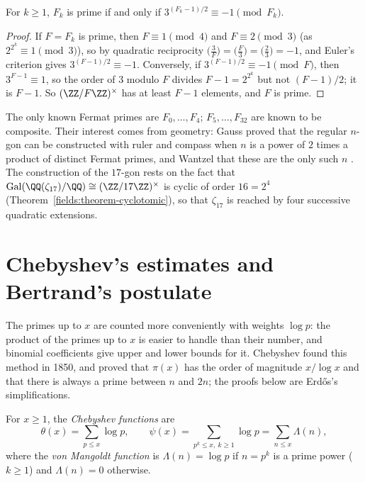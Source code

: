 \begin{theorem}\label{prime-numbers:theorem-pepin}
For $k \geq 1$, $F_k$ is prime if and only if $3^{(F_k - 1)/2} \equiv -1 \pmod{F_k}$.
\end{theorem}

\begin{proof}
If $F = F_k$ is prime, then $F \equiv 1 \pmod 4$ and $F \equiv 2 \pmod 3$ (as $2^{2^k} \equiv 1 \pmod 3$), so by quadratic reciprocity $\bigl(\frac{3}{F}\bigr) = \bigl(\frac{F}{3}\bigr) = \bigl(\frac{2}{3}\bigr) = -1$,
and Euler's criterion gives $3^{(F-1)/2} \equiv -1$. Conversely, if $3^{(F-1)/2} \equiv -1 \pmod F$, then $3^{F-1} \equiv 1$, so the order of $3$ modulo $F$ divides $F - 1 = 2^{2^k}$ but not
$(F - 1)/2$; it is $F - 1$. So $(\ZZ/F\ZZ)^\times$ has at least $F - 1$ elements, and $F$ is prime.
\end{proof}

\begin{remark}\label{prime-numbers:remark-gauss-polygons}
The only known Fermat primes are $F_0, \ldots, F_4$; $F_5, \ldots, F_{32}$ are known to be composite. Their interest comes from geometry: Gauss proved that the regular $n$-gon can be constructed
with ruler and compass when $n$ is a power of $2$ times a product of distinct Fermat primes, and Wantzel that these are the only such $n$ \cite{hardy-wright}. The construction of the
$17$-gon rests on the fact that $\operatorname{Gal}(\QQ(\zeta_{17})/\QQ) \cong (\ZZ/17\ZZ)^\times$ is cyclic of order $16 = 2^4$ (Theorem~\ref{fields:theorem-cyclotomic}), so that $\zeta_{17}$ is
reached by four successive quadratic extensions.
\end{remark}

\section{Chebyshev's estimates and Bertrand's postulate}\label{prime-numbers:section-chebyshev}

The primes up to $x$ are counted more conveniently with weights $\log p$: the product of the primes up to $x$ is easier to handle than their number, and binomial coefficients give upper and lower
bounds for it. Chebyshev found this method in 1850, and proved that $\pi(x)$ has the order of magnitude $x/\log x$ and that there is always a prime between $n$ and $2n$; the proofs below are
Erd\H{o}s's simplifications.

\begin{definition}\label{prime-numbers:definition-chebyshev-functions}
For $x \geq 1$, the \emph{Chebyshev functions} are
\[
\theta(x) = \sum_{p \leq x}\log p, \qquad \psi(x) = \sum_{p^k \leq x,\ k \geq 1}\log p = \sum_{n \leq x}\Lambda(n),
\]
where the \emph{von Mangoldt function} is $\Lambda(n) = \log p$ if $n = p^k$ is a prime power ($k \geq 1$) and $\Lambda(n) = 0$ otherwise.
\end{definition}

